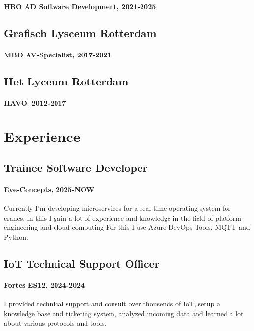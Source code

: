 \documentclass{article}
\begin{document}
\paragraph{HBO AD Software Development, 2021-2025}

\subsection{Grafisch Lysceum Rotterdam}
\paragraph{MBO AV-Specialist, 2017-2021}

\subsection{Het Lyceum Rotterdam}
\paragraph{HAVO, 2012-2017}

\section{Experience}
\subsection{Trainee Software Developer}
\paragraph{Eye-Concepts, 2025-NOW}
Currently I'm developing microservices for a real time operating system for cranes. In this I gain a lot of experience and knowledge in the field of platform engineering and cloud computing For this I use Azure DevOps Tools, MQTT and Python.


\subsection{IoT Technical Support Officer}
\paragraph{Fortes ES12, 2024-2024}
I provided technical support and consult over thousends of IoT, setup a knowledge base and ticketing system, analyzed incoming data and learned a lot about various protocols and tools.
\end{document}
